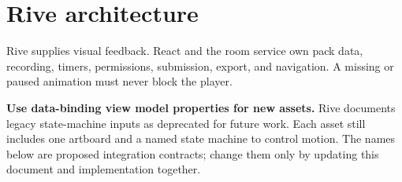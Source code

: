 \documentclass[10pt,a4paper]{article}
\begin{document}
\section{Rive architecture}
Rive supplies visual feedback. React and the room service own pack data, recording, timers, permissions, submission, export, and navigation. A missing or paused animation must never block the player.
\begin{center}
\end{center}
\textbf{Use data-binding view model properties for new assets.} Rive documents legacy state-machine inputs as deprecated for future work. Each asset still includes one artboard and a named state machine to control motion. The names below are proposed integration contracts; change them only by updating this document and implementation together.
\end{document}
